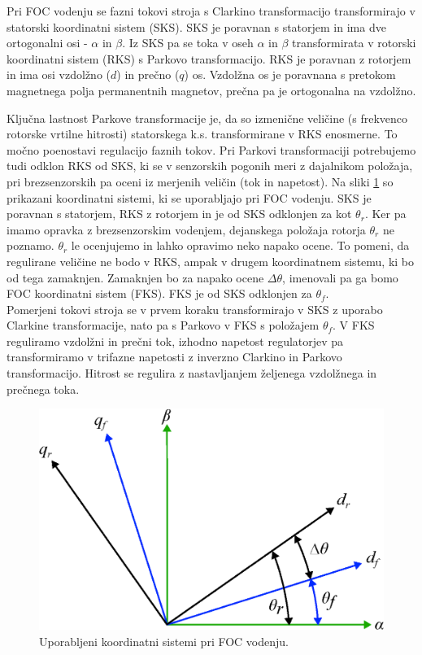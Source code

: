 \documentclass[a4paper,twoside,openright,12pt,slovene]{book}
\begin{document}
Pri FOC vodenju se fazni tokovi stroja s Clarkino transformacijo transformirajo v statorski koordinatni sistem (SKS). SKS je poravnan s statorjem in ima dve ortogonalni osi - $\alpha$ in $\beta$. Iz
SKS pa se toka v oseh $\alpha$ in $\beta$ transformirata v rotorski koordinatni sistem (RKS) s Parkovo transformacijo. RKS je poravnan z rotorjem in ima osi vzdolžno ($d$) in prečno ($q$) os. Vzdolžna
os je poravnana s pretokom magnetnega polja permanentnih magnetov, prečna pa je ortogonalna na vzdolžno. 

Ključna lastnost Parkove transformacije je, da so izmenične veličine (s frekvenco rotorske vrtilne hitrosti) statorskega k.s. transformirane v RKS enosmerne. To močno poenostavi regulacijo faznih
tokov. Pri Parkovi transformaciji potrebujemo tudi odklon RKS od SKS, ki se v senzorskih pogonih meri z dajalnikom položaja, pri brezsenzorskih pa oceni iz merjenih veličin (tok in napetost). Na sliki
\ref{koordinatniSistemSimple} so prikazani koordinatni sistemi, ki se uporabljajo pri FOC vodenju. SKS je poravnan s statorjem, RKS z rotorjem in je od SKS odklonjen za kot $\theta_r$. Ker pa imamo
opravka z brezsenzorskim vodenjem, dejanskega položaja rotorja $\theta_r$ ne poznamo. $\theta_r$ le ocenjujemo in lahko opravimo neko napako ocene. To pomeni, da regulirane veličine ne bodo v RKS,
ampak v drugem koordinatnem sistemu, ki bo od tega zamaknjen. Zamaknjen bo za napako ocene $\Delta\theta$, imenovali pa ga bomo FOC koordinatni sistem (FKS). FKS je od SKS odklonjen za $\theta_f$. \\
Pomerjeni tokovi stroja se v prvem koraku transformirajo v SKS z uporabo Clarkine transformacije, nato pa s Parkovo v FKS s položajem $\theta_f$. V FKS reguliramo vzdolžni in prečni tok, izhodno
napetost regulatorjev pa transformiramo v trifazne napetosti z inverzno Clarkino in Parkovo transformacijo. Hitrost se regulira z nastavljanjem željenega vzdolžnega in prečnega toka.

\begin{figure}[!htbp]
    \centering
    \includegraphics[width=0.7\columnwidth]{Slike/Inkscape/koordinatniSistemSimple.eps}
    \caption{\label{koordinatniSistemSimple} Uporabljeni koordinatni sistemi pri FOC vodenju.}
\end{figure}
\end{document}
